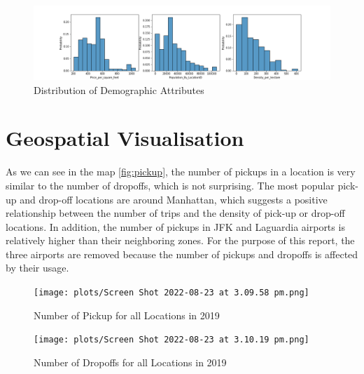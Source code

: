 \documentclass[11pt]{article}
\begin{document}
\begin{figure}[h]
    \includegraphics[width=1.15\textwidth]{plots/distribution_of_demo.png}
    \caption{Distribution of Demographic Attributes}
    \label{fig:distributionofdemo}
\end{figure}
\section{Geospatial Visualisation}
As we can see in the map \ref{fig:pickup}, the number of pickups in a location is very similar to the number of dropoffs, which is not surprising. The most popular pick-up and drop-off locations are around Manhattan, which suggests a positive relationship between the number of trips and the density of pick-up or drop-off locations. In addition, the number of pickups in JFK and Laguardia airports is relatively higher than their neighboring zones. For the purpose of this report, the three airports are removed because the number of pickups and dropoffs is affected by their usage. 
\begin{figure}[h]
    \centering
    \begin{minipage}{0.45\textwidth}
        \centering
        \texttt{[image: plots/Screen Shot 2022-08-23 at 3.09.58 pm.png]}
        \caption{Number of Pickup for all Locations in 2019}
        \label{fig:pickup}
    \end{minipage}\hfill
    \begin{minipage}{0.45\textwidth}
        \centering
        \texttt{[image: plots/Screen Shot 2022-08-23 at 3.10.19 pm.png]}
        \caption{Number of Dropoffs for all Locations in 2019}
        \label{fig:dropoff}
    \end{minipage}
\end{figure}
\end{document}
